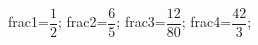 \documentclass[exercice]{thedocument}%
\begin{document}
%
    \>frac1=$\dfrac12$;%
    \>frac2=$\dfrac65$;%
    \>frac3=$\dfrac{12}{80}$;%
    \>frac4=$\dfrac{42}3$;%
\end{document}
